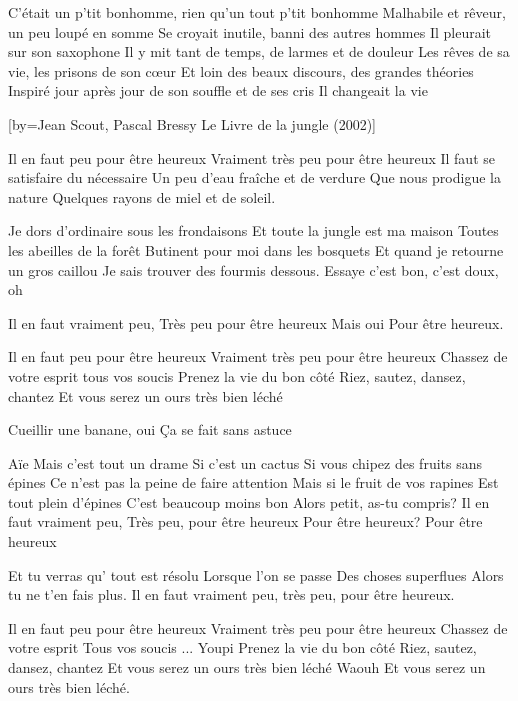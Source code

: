 \beginverse
C'était un p'tit bonhomme, rien qu'un tout p'tit bonhomme
Malhabile et rêveur, un peu loupé en somme
Se croyait inutile, banni des autres hommes
Il pleurait sur son saxophone
Il y mit tant de temps, de larmes et de douleur
Les rêves de sa vie, les prisons de son cœur
Et loin des beaux discours, des grandes théories
Inspiré jour après jour de son souffle et de ses cris
Il changeait la vie
\endverse

[by={Jean Scout, Pascal Bressy \- Le Livre de la jungle (2002)}]

\beginverse
Il en faut peu pour être heureux
Vraiment très peu pour être heureux
Il faut se satisfaire du nécessaire
Un peu d'eau fraîche et de verdure
Que nous prodigue la nature
Quelques rayons de miel et de soleil.
\endverse

\beginverse
Je dors d'ordinaire sous les frondaisons
Et toute la jungle est ma maison
Toutes les abeilles de la forêt
Butinent pour moi dans les bosquets
Et quand je retourne un gros caillou
Je sais trouver des fourmis dessous.
Essaye c'est bon, c'est doux, oh\!
\endverse

\beginverse
Il en faut vraiment peu,
Très peu pour être heureux\!
Mais oui\!
Pour être heureux.
\endverse

\beginverse
Il en faut peu pour être heureux
Vraiment très peu pour être heureux
Chassez de votre esprit tous vos soucis
Prenez la vie du bon côté
Riez, sautez, dansez, chantez
Et vous serez un ours très bien léché\!
\endverse

\beginverse
Cueillir une banane, oui
Ça se fait sans astuce
\endverse

\beginverse
Aïe\!
Mais c'est tout un drame
Si c'est un cactus
Si vous chipez des fruits sans épines
Ce n'est pas la peine de faire attention
Mais si le fruit de vos rapines
Est tout plein d'épines
C'est beaucoup moins bon\!
Alors petit, as-tu compris?
Il en faut vraiment peu,
Très peu, pour être heureux\!
Pour être heureux?
Pour être heureux\!
\endverse

\beginverse
Et tu verras qu' tout est résolu
Lorsque l'on se passe
Des choses superflues
Alors tu ne t'en fais plus.
Il en faut vraiment peu, très peu, pour être heureux.
\endverse

\beginverse
Il en faut peu pour être heureux
Vraiment très peu pour être heureux
Chassez de votre esprit
Tous vos soucis ... Youpi
Prenez la vie du bon côté
Riez, sautez, dansez, chantez
Et vous serez un ours très bien léché
Waouh
Et vous serez un ours très bien léché.
\endverse

